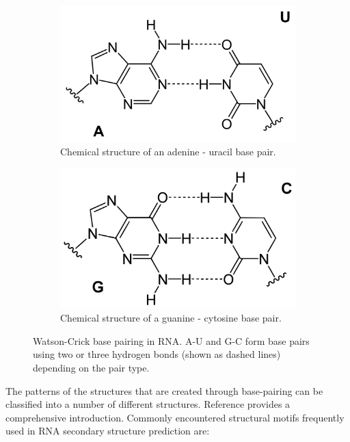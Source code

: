 \documentclass[journal]{IEEEtran}
\begin{document}
 \begin{figure}[!tbp]
  \begin{subfigure}[b]{0.5\textwidth}
    \includegraphics[width=\textwidth]{img/Base_pair_AU.png}
    \caption{Chemical structure of an adenine - uracil base pair.}
    \label{fig:au-base-pair}
  \end{subfigure}
  \hfill
  \begin{subfigure}[b]{0.5\textwidth}
    \includegraphics[width=\textwidth]{img/Base_pair_GC.png}
    \caption{Chemical structure of a guanine - cytosine base pair.}
    \label{fig:gc-base-pair}
  \end{subfigure}
  \caption{Watson-Crick base pairing in RNA. A-U and G-C form base pairs using two or three hydrogen bonds (shown as dashed lines) depending on the pair type.}
\end{figure}

The patterns of the structures that are created through base-pairing can be classified into a number of different structures. Reference \cite{nowakowski1997rna} provides a comprehensive introduction. Commonly encountered structural motifs frequently used in RNA secondary structure prediction are:
\end{document}
